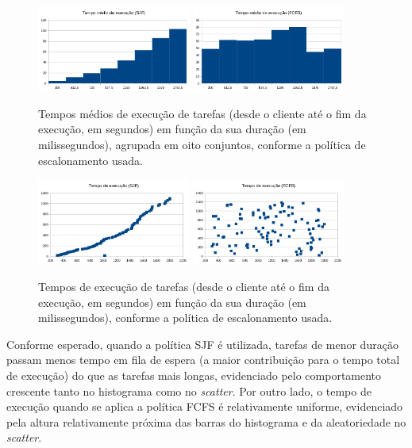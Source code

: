 \documentclass[11pt]{article}
\begin{document}
\begin{figure}[H]
    \centering
    \includegraphics[width=0.45\textwidth]{report_figures/HistogramSJF.png}
    \includegraphics[width=0.45\textwidth]{report_figures/HistogramFCFS.png}
    \caption{Tempos médios de execução de tarefas (desde o cliente até o fim da execução, em
        segundos) em função da sua duração (em milissegundos), agrupada em oito conjuntos, conforme
        a política de escalonamento usada.}
\end{figure}

\begin{figure}[H]
    \centering
    \includegraphics[width=0.45\textwidth]{report_figures/ScatterSJF.png}
    \includegraphics[width=0.45\textwidth]{report_figures/ScatterFCFS.png}
    \caption{Tempos de execução de tarefas (desde o cliente até o fim da execução, em segundos) em
        função da sua duração (em milissegundos), conforme a política de escalonamento usada.}
\end{figure}

Conforme esperado, quando a política SJF é utilizada, tarefas de menor duração passam menos tempo em
fila de espera (a maior contribuição para o tempo total de execução) do que as tarefas mais longas,
evidenciado pelo comportamento crescente tanto no histograma como no \emph{scatter}. Por outro lado,
o tempo de execução quando se aplica a política FCFS é relativamente uniforme, evidenciado pela
altura relativamente próxima das barras do histograma e da aleatoriedade no \emph{scatter}.
\end{document}
